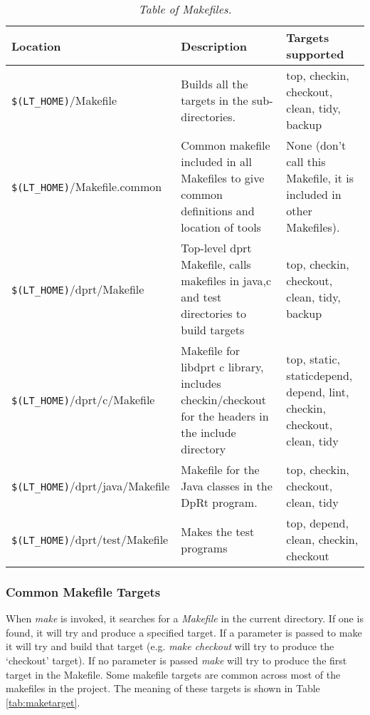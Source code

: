 \documentclass[10pt,a4paper]{article}
\begin{document}
\begin{table}[!h]
\begin{center}
\begin{footnotesize}
\begin{tabular}{|l|p{20em}|p{20em}|} \hline
{\bf Location} 		& {\bf Description} 				& {\bf Targets supported} \\ \hline
\verb'$(LT_HOME)'/Makefile	& Builds all the targets in the sub-directories. & 
top, checkin, checkout, clean, tidy, backup \\ \hline
\verb'$(LT_HOME)'/Makefile.common& Common makefile included in all Makefiles to give common definitions and location of tools &
None (don't call this Makefile, it is included in other Makefiles). \\ \hline
\verb'$(LT_HOME)'/dprt/Makefile	& Top-level dprt Makefile, calls makefiles in java,c and test directories to build targets &
top, checkin, checkout, clean, tidy, backup \\ \hline
\verb'$(LT_HOME)'/dprt/c/Makefile& Makefile for libdprt c library, includes checkin/checkout for the headers in the 
include directory &
top, static, staticdepend, depend, lint, checkin, checkout, clean, tidy \footnotemark[3] \\ \hline
\verb'$(LT_HOME)'/dprt/java/Makefile& Makefile for the Java classes in the DpRt program. &
top, checkin, checkout, clean, tidy \footnotemark[4] \\ \hline
\verb'$(LT_HOME)'/dprt/test/Makefile& Makes the test programs &
top, depend, clean, checkin, checkout\\ \hline
\end{tabular}
\end{footnotesize}
\end{center}
\caption{\em Table of Makefiles.}
\label{tab:makefile} 
\end{table}

\subsubsection{Common Makefile Targets}
When {\em make} is invoked, it searches for a {\em Makefile} in the current directory. If one is found, it
will try and produce a specified target. If a parameter is passed to make it will try and build that target
(e.g. {\em make checkout} will try to produce the `checkout' target). If no parameter is passed {\em make} will
try to produce the first target in the Makefile.
Some makefile targets are common across most of the makefiles in the project. The meaning of these targets is
shown in Table \ref{tab:maketarget}.
\end{document}

